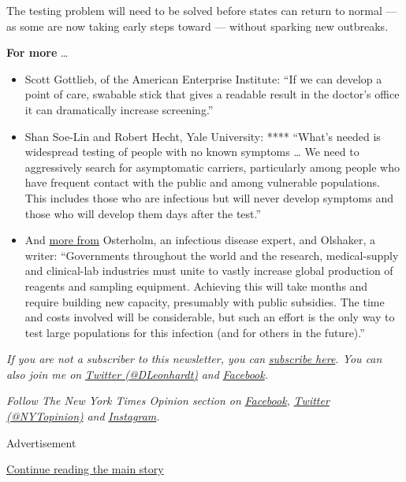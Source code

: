 The testing problem will need to be solved before states can return to
normal --- as some are now taking early steps toward --- without
sparking new outbreaks.

\textbf{For more} \ldots{}

\begin{itemize}
\item
  Scott Gottlieb, of the American Enterprise Institute: ``If we can
  develop a point of care, swabable stick that gives a readable result
  in the doctor's office it can dramatically increase screening.''
\item
  Shan Soe-Lin and Robert Hecht, Yale University: **** ``What's needed
  is widespread testing of people with no known symptoms \ldots{} We
  need to aggressively search for asymptomatic carriers, particularly
  among people who have frequent contact with the public and among
  vulnerable populations. This includes those who are infectious but
  will never develop symptoms and those who will develop them days after
  the test.''
\item
  And
  \href{https://www.nytimes.com/2020/04/28/opinion/coronavirus-testing.html}{more
  from} Osterholm, an infectious disease expert, and Olshaker, a writer:
  ``Governments throughout the world and the research, medical-supply
  and clinical-lab industries must unite to vastly increase global
  production of reagents and sampling equipment. Achieving this will
  take months and require building new capacity, presumably with public
  subsidies. The time and costs involved will be considerable, but such
  an effort is the only way to test large populations for this infection
  (and for others in the future).''
\end{itemize}

\emph{If you are not a subscriber to this newsletter, you can}
\href{https://www.nytimes.com/newsletters/david-leonhardt}{\emph{subscribe
here}}\emph{. You can also join me on}
\href{https://twitter.com/DLeonhardt}{\emph{Twitter (@DLeonhardt)}}
\emph{and}
\href{https://www.facebook.com/DavidRLeonhardt/}{\emph{Facebook}}\emph{.}

\emph{Follow The New York Times Opinion section on}
\href{https://www.facebook.com/nytopinion}{\emph{Facebook}}\emph{,}
\href{http://twitter.com/NYTOpinion}{\emph{Twitter (@NYTopinion)}}
\emph{and}
\href{https://www.instagram.com/nytopinion/}{\emph{Instagram}}\emph{.}

Advertisement

\protect\hyperlink{after-bottom}{Continue reading the main story}

